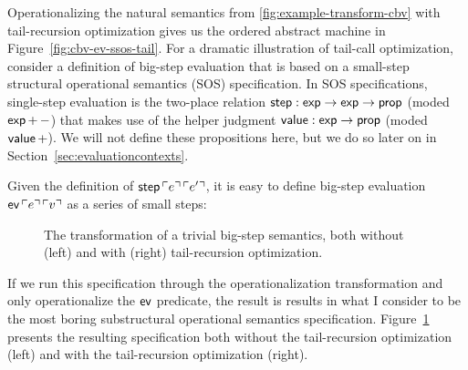 Operationalizing the natural semantics from
\ref{fig:example-transform-cbv} with tail-recursion optimization gives
us the ordered abstract machine in Figure~\ref{fig:cbv-ev-ssos-tail}.
For a dramatic illustration of tail-call optimization, consider a
definition of
big-step evaluation that is based on a small-step structural
operational semantics (SOS) specification. In SOS specifications,
single-step evaluation is the two-place relation ${\sf step} : {\sf
  exp} \rightarrow {\sf exp} \rightarrow {\sf prop}$ (moded ${\sf
  exp}\,{+}\,{-}$) that makes use of the helper judgment ${\sf value}
: {\sf exp} \rightarrow {\sf prop}$ (moded ${\sf value}\,{+}$). We
will not define these propositions here, but we do so later on in
Section~\ref{sec:evaluationcontexts}.

Given the definition of ${\sf step}\,{\ulcorner{e}\urcorner}\,{\ulcorner{e'}\urcorner}$, it is
easy to define big-step evaluation ${\sf ev}\,{\ulcorner{e}\urcorner}\,{\ulcorner{v}\urcorner}$
as a series of small steps:

\smallskip
{}
\smallskip

\begin{figure}
\begin{minipage}[b]{0.55\linewidth}
\end{minipage}
\hspace{0.5cm}
\begin{minipage}[b]{0.45\linewidth}
\end{minipage}
\caption{The transformation of a trivial big-step semantics, both
  without (left) and with (right) tail-recursion optimization.}
\label{fig:sos-tailrecursion}
\end{figure}

If we run this specification through the operationalization
transformation and only operationalize the ${\sf ev}$ predicate,
the result is
results in what I consider to be the most boring substructural
operational semantics specification. 
Figure~\ref{fig:sos-tailrecursion} presents the resulting specification
 both without the tail-recursion
optimization (left) and with the tail-recursion optimization (right).

